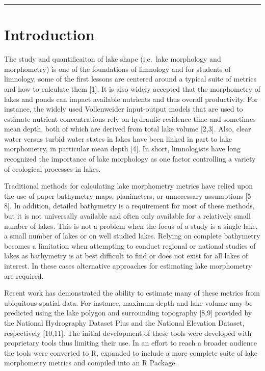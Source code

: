 \documentclass[11pt,]{article}
\begin{document}
\vspace{3mm}

\hrule

\doublespace

\section{Introduction}\label{introduction}

The study and quantificaiton of lake shape (i.e.~lake morphology and
morphometry) is one of the foundations of limnology and for students of
limnology, some of the first lessons are centered around a typical suite
of metrics and how to calculate them {[}1{]}. It is also widely accepted
that the morphometry of lakes and ponds can impact available nutrients
and thus overall productivity. For instance, the widely used
Vollenweider input-output models that are used to estimate nutrient
concentrations rely on hydraulic residence time and sometimes mean
depth, both of which are derived from total lake volume {[}2,3{]}. Also,
clear water versus turbid water states in lakes have been linked in part
to lake morphometry, in particular mean depth {[}4{]}. In short,
limnologists have long recognized the importance of lake morphology as
one factor controlling a variety of ecological processes in lakes.

Traditional methods for calculating lake morphometry metrics have relied
upon the use of paper bathymetry maps, planimeters, or unnecessary
assumptions {[}5--8{]}. In addition, detailed bathymetry is a
requirement for most of these methods, but it is not universally
available and often only available for a relatively small number of
lakes. This is not a problem when the focus of a study is a single lake,
a small number of lakes or on well studied lakes. Relying on complete
bathymetry becomes a limitation when attempting to conduct regional or
national studies of lakes as bathymetry is at best difficult to find or
does not exist for all lakes of interest. In these cases alternative
approaches for estimating lake morphometry are required.

Recent work has demonstrated the ability to estimate many of these
metrics from ubiquitous spatial data. For instance, maximum depth and
lake volume may be predicted using the lake polygon and surrounding
topography {[}8,9{]} provided by the National Hydrography Dataset Plus
and the National Elevation Dataset, respectively {[}10,11{]}. The
initial development of these tools were developed with proprietary tools
thus limiting their use. In an effort to reach a broader audience the
tools were converted to R, expanded to include a more complete suite of
lake morphometry metrics and compiled into an R Package.
\end{document}
